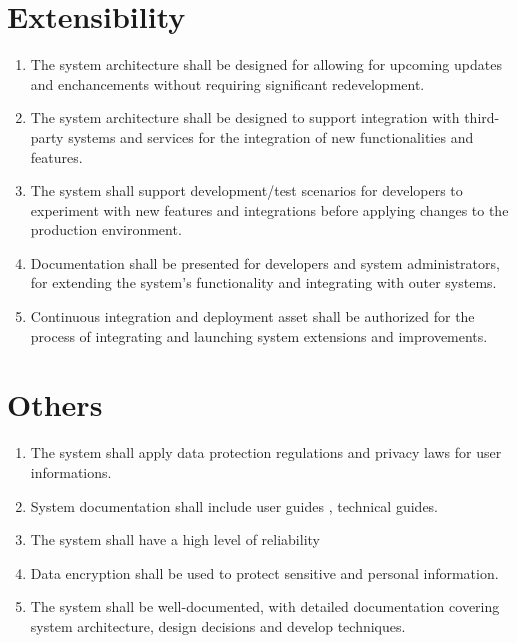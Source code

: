 \documentclass[a4paper,12pt]{report}
\begin{document}
	\section{Extensibility}
	\begin{enumerate}
		\item The system architecture shall be designed for allowing for upcoming updates and enchancements without requiring significant redevelopment.
		
		\item The system architecture shall be designed to support integration with third-party systems and services for the integration of new 
		functionalities and features.
		
		\item The system shall support  development/test scenarios for developers to experiment with new features and integrations before applying changes to the production environment.
		
		\item Documentation shall be presented for developers and system administrators,  for extending the system's functionality and integrating with outer systems.
		
		\item Continuous integration and deployment asset shall be authorized for the process of integrating and launching system extensions and improvements.
	\end{enumerate}
	\section{Others}
	\begin{enumerate}
		\item The system shall apply data protection regulations and privacy laws for user informations. 
		
		\item System documentation shall include user guides , technical guides. 
		
		\item The system shall have a high level of reliability
		
		\item Data encryption shall be used to protect sensitive and personal information.
		
		\item The system shall be well-documented, with detailed documentation covering system architecture, design decisions and develop techniques.
		
	\end{enumerate}
	
\end{document}
